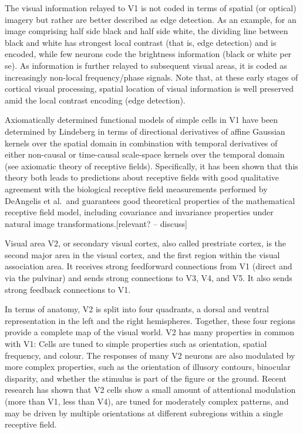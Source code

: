 \documentclass[]{book}
\begin{document}
The visual information relayed to V1 is not coded in terms of spatial (or optical) imagery but rather are better described as edge detection. As an example, for an image comprising half side black and half side white, the dividing line between black and white has strongest local contrast (that is, edge detection) and is encoded, while few neurons code the brightness information (black or white per se). As information is further relayed to subsequent visual areas, it is coded as increasingly non-local frequency/phase signals. Note that, at these early stages of cortical visual processing, spatial location of visual information is well preserved amid the local contrast encoding (edge detection).

Axiomatically determined functional models of simple cells in V1 have been determined by Lindeberg in terms of directional derivatives of affine Gaussian kernels over the spatial domain in combination with temporal derivatives of either non-causal or time-causal scale-space kernels over the temporal domain (see axiomatic theory of receptive fields). Specifically, it has been shown that this theory both leads to predictions about receptive fields with good qualitative agreement with the biological receptive field measurements performed by DeAngelis et al.~and guarantees good theoretical properties of the mathematical receptive field model, including covariance and invariance properties under natural image transformations.{[}relevant? -- discuss{]}

Visual area V2, or secondary visual cortex, also called prestriate cortex, is the second major area in the visual cortex, and the first region within the visual association area. It receives strong feedforward connections from V1 (direct and via the pulvinar) and sends strong connections to V3, V4, and V5. It also sends strong feedback connections to V1.

In terms of anatomy, V2 is split into four quadrants, a dorsal and ventral representation in the left and the right hemispheres. Together, these four regions provide a complete map of the visual world. V2 has many properties in common with V1: Cells are tuned to simple properties such as orientation, spatial frequency, and colour. The responses of many V2 neurons are also modulated by more complex properties, such as the orientation of illusory contours, binocular disparity, and whether the stimulus is part of the figure or the ground. Recent research has shown that V2 cells show a small amount of attentional modulation (more than V1, less than V4), are tuned for moderately complex patterns, and may be driven by multiple orientations at different subregions within a single receptive field.
\end{document}

